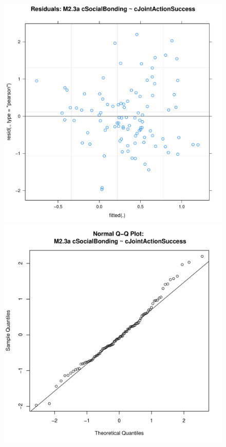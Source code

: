 {\begin{figure}[htbp]
        \includegraphics[scale =.4]{images/MLM23aScatter.pdf}
        \includegraphics[scale =.4]{images/MLM23aQQNorm.pdf}

\end{figure}}
